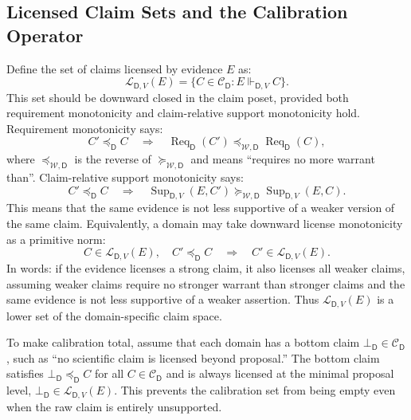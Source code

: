 \documentclass[11pt,a4paper]{article}
\newcommand{\Req}{\operatorname{Req}}
\newcommand{\Sup}{\operatorname{Sup}}
\newcommand{\Dom}{\mathsf{D}}
\begin{document}
\subsection{Licensed Claim Sets and the Calibration Operator}

Define the set of claims licensed by evidence $E$ as:
\begin{equation}
\mathcal{L}_{\Dom,V}(E)=\{C\in\mathcal{C}_{\Dom}:E\Vdash_{\Dom,V} C\}.
\end{equation}
This set should be downward closed in the claim poset, provided both requirement monotonicity and claim-relative support monotonicity hold. Requirement monotonicity says:
\begin{equation}
C'\preceq_{\Dom} C
\quad\Rightarrow\quad
\Req_{\Dom}(C')\preceq_{\mathcal{W},\Dom}\Req_{\Dom}(C),
\end{equation}
where $\preceq_{\mathcal{W},\Dom}$ is the reverse of $\succeq_{\mathcal{W},\Dom}$ and means ``requires no more warrant than''. Claim-relative support monotonicity says:
\begin{equation}
C'\preceq_{\Dom} C
\quad\Rightarrow\quad
\Sup_{\Dom,V}(E,C')\succeq_{\mathcal{W},\Dom}\Sup_{\Dom,V}(E,C).
\end{equation}
This means that the same evidence is not less supportive of a weaker version of the same claim. Equivalently, a domain may take downward license monotonicity as a primitive norm:
\begin{equation}
C\in\mathcal{L}_{\Dom,V}(E),\quad C'\preceq_{\Dom} C
\quad\Rightarrow\quad
C'\in\mathcal{L}_{\Dom,V}(E).
\end{equation}
In words: if the evidence licenses a strong claim, it also licenses all weaker claims, assuming weaker claims require no stronger warrant than stronger claims and the same evidence is not less supportive of a weaker assertion. Thus $\mathcal{L}_{\Dom,V}(E)$ is a lower set of the domain-specific claim space.

To make calibration total, assume that each domain has a bottom claim $\bot_{\Dom}\in\mathcal{C}_{\Dom}$, such as ``no scientific claim is licensed beyond proposal.'' The bottom claim satisfies $\bot_{\Dom}\preceq_{\Dom}C$ for all $C\in\mathcal{C}_{\Dom}$ and is always licensed at the minimal proposal level, $\bot_{\Dom}\in\mathcal{L}_{\Dom,V}(E)$. This prevents the calibration set from being empty even when the raw claim is entirely unsupported.
\end{document}
